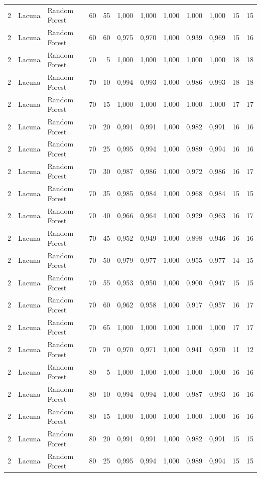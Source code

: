 \begin{longtable}{@{}rllrrrrrrrrr@{}}
2 & Lacuna & Random Forest & 60 & 55 & 1,000 & 1,000 & 1,000 & 1,000 & 1,000 & 15 & 15 \\
2 & Lacuna & Random Forest & 60 & 60 & 0,975 & 0,970 & 1,000 & 0,939 & 0,969 & 15 & 16 \\
2 & Lacuna & Random Forest & 70 & 5 & 1,000 & 1,000 & 1,000 & 1,000 & 1,000 & 18 & 18 \\
2 & Lacuna & Random Forest & 70 & 10 & 0,994 & 0,993 & 1,000 & 0,986 & 0,993 & 18 & 18 \\
2 & Lacuna & Random Forest & 70 & 15 & 1,000 & 1,000 & 1,000 & 1,000 & 1,000 & 17 & 17 \\
2 & Lacuna & Random Forest & 70 & 20 & 0,991 & 0,991 & 1,000 & 0,982 & 0,991 & 16 & 16 \\
2 & Lacuna & Random Forest & 70 & 25 & 0,995 & 0,994 & 1,000 & 0,989 & 0,994 & 16 & 16 \\
2 & Lacuna & Random Forest & 70 & 30 & 0,987 & 0,986 & 1,000 & 0,972 & 0,986 & 16 & 17 \\
2 & Lacuna & Random Forest & 70 & 35 & 0,985 & 0,984 & 1,000 & 0,968 & 0,984 & 15 & 15 \\
2 & Lacuna & Random Forest & 70 & 40 & 0,966 & 0,964 & 1,000 & 0,929 & 0,963 & 16 & 17 \\
2 & Lacuna & Random Forest & 70 & 45 & 0,952 & 0,949 & 1,000 & 0,898 & 0,946 & 16 & 16 \\
2 & Lacuna & Random Forest & 70 & 50 & 0,979 & 0,977 & 1,000 & 0,955 & 0,977 & 14 & 15 \\
2 & Lacuna & Random Forest & 70 & 55 & 0,953 & 0,950 & 1,000 & 0,900 & 0,947 & 15 & 15 \\
2 & Lacuna & Random Forest & 70 & 60 & 0,962 & 0,958 & 1,000 & 0,917 & 0,957 & 16 & 17 \\
2 & Lacuna & Random Forest & 70 & 65 & 1,000 & 1,000 & 1,000 & 1,000 & 1,000 & 17 & 17 \\
2 & Lacuna & Random Forest & 70 & 70 & 0,970 & 0,971 & 1,000 & 0,941 & 0,970 & 11 & 12 \\
2 & Lacuna & Random Forest & 80 & 5 & 1,000 & 1,000 & 1,000 & 1,000 & 1,000 & 16 & 16 \\
2 & Lacuna & Random Forest & 80 & 10 & 0,994 & 0,994 & 1,000 & 0,987 & 0,993 & 16 & 16 \\
2 & Lacuna & Random Forest & 80 & 15 & 1,000 & 1,000 & 1,000 & 1,000 & 1,000 & 16 & 16 \\
2 & Lacuna & Random Forest & 80 & 20 & 0,991 & 0,991 & 1,000 & 0,982 & 0,991 & 15 & 15 \\
2 & Lacuna & Random Forest & 80 & 25 & 0,995 & 0,994 & 1,000 & 0,989 & 0,994 & 15 & 15 \\

\end{longtable}
